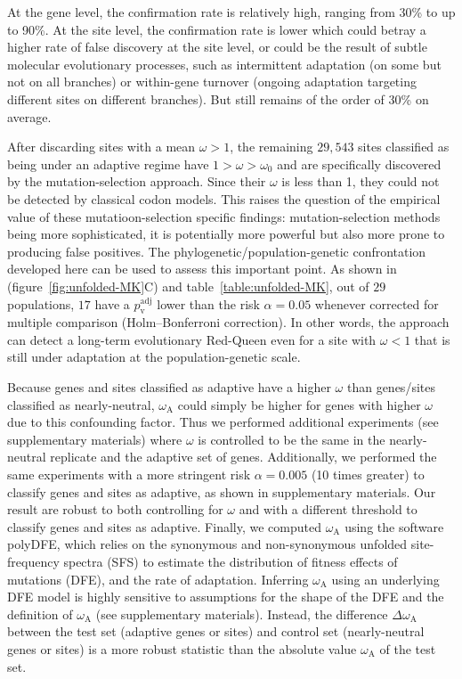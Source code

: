 \documentclass{article}
\newcommand{\rateApop}{\omega_{\mathrm{A}}}
\begin{document}
    At the gene level, the confirmation rate is relatively high, ranging from 30\% to up to 90\%.
    At the site level, the confirmation rate is lower which could betray a higher rate of false discovery at the site level, or could be the result of subtle molecular evolutionary processes, such as intermittent adaptation (on some but not on all branches) or within-gene turnover (ongoing adaptation targeting different sites on different branches).
    But still remains of the order of 30\% on average.

    After discarding sites with a mean $\omega > 1$, the remaining $29,543$ sites classified as being under an adaptive regime have $1 > \omega > \omega_{0}$ and are specifically discovered by the mutation-selection approach.
    Since their $\omega$ is less than 1, they could not be detected by classical codon models.
    This raises the question of the empirical value of these mutatioon-selection specific findings: mutation-selection methods being more sophisticated, it is potentially more powerful but also more prone to producing false positives.
    The phylogenetic/population-genetic confrontation developed here can be used to assess this important point.
    As shown in (figure~\ref{fig:unfolded-MK}C) and table~\ref{table:unfolded-MK}, out of $29$ populations, $17$ have a $p_{\mathrm{v}}^{\mathrm{adj}}$ lower than the risk $\alpha=0.05$ whenever corrected for multiple comparison (Holm–Bonferroni correction).
    In other words, the approach can detect a long-term evolutionary Red-Queen even for a site with $\omega < 1$ that is still under adaptation at the population-genetic scale.

    Because genes and sites classified as adaptive have a higher $\omega$ than genes/sites classified as nearly-neutral, $\rateApop$ could simply be higher for genes with higher $\omega$ due to this confounding factor.
    Thus we performed additional experiments (see supplementary materials) where $\omega$ is controlled to be the same in the nearly-neutral replicate and the adaptive set of genes.
    Additionally, we performed the same experiments with a more stringent risk $\alpha=0.005$ (10 times greater) to classify genes and sites as adaptive, as shown in supplementary materials.
    Our result are robust to both controlling for $\omega$ and with a different threshold to classify genes and sites as adaptive.
    Finally, we computed $\rateApop$ using the software polyDFE\cite{tataru_polydfe_2020}, which relies on the synonymous and non-synonymous unfolded site-frequency spectra (SFS) to estimate the distribution of fitness effects of mutations (DFE), and the rate of adaptation.
    Inferring $\rateApop$ using an underlying DFE model is highly sensitive to assumptions for the shape of the DFE and the definition of $\rateApop$ (see supplementary materials).
    Instead, the difference $\Delta \rateApop$ between the test set (adaptive genes or sites) and control set (nearly-neutral genes or sites) is a more robust statistic than the absolute value $\rateApop$ of the test set.
\end{document}
